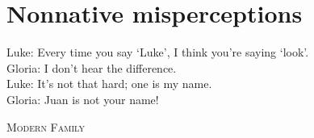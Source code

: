 


\section{Nonnative misperceptions}
\setlength{\epigraphwidth}{0.7\textwidth}
\epigraph{Luke: Every time you say `Luke', I think you're saying `look'. \\ Gloria: I don't hear the difference. \\ Luke: It's not that hard; one is my name. \\ Gloria: Juan is not your name!}{\textsc{Modern Family}}


